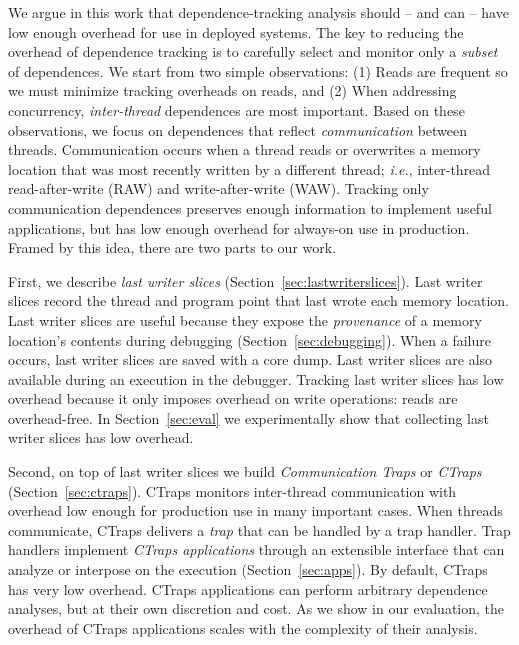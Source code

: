 \documentclass[preprint,9pt]{sigplanconf}
\newcommand{\ctraps}{CTraps\xspace}
\begin{document}
We argue in this work that dependence-tracking analysis should -- and can --
have low enough overhead for use in deployed systems.  The key to reducing the
overhead of dependence tracking is to carefully select and monitor only a
{\em subset} of dependences.  We start from two simple observations: (1) Reads are
frequent so we must minimize tracking overheads on reads, and (2) When
addressing concurrency, {\em inter-thread} dependences are most important.
Based on these observations, we focus on dependences that reflect {\em
communication} between threads.  Communication occurs when a thread reads or
overwrites a memory location that was most recently written by a different
thread; {\em i.e.}, inter-thread read-after-write (RAW) and write-after-write
(WAW).  Tracking only communication dependences preserves enough information to
implement useful applications, but has low enough overhead for always-on use in
production.  Framed by this idea, there are two parts to our work.

First, we describe {\em last writer slices}
(Section~\ref{sec:lastwriterslices}).  Last writer slices record the thread and
program point that last wrote each memory location.  Last writer slices are
useful because they expose the {\em provenance} of a memory location's contents
during debugging (Section~\ref{sec:debugging}).  When a failure occurs, last
writer slices are saved with a core dump.  Last writer slices are also
available during an execution in the debugger.  Tracking last writer slices has
low overhead because it only imposes overhead on write operations:  reads are
overhead-free.  In Section~\ref{sec:eval} we experimentally show
that collecting last writer slices has low overhead.

Second, on top of last writer slices we build {\em Communication Traps} or {\em
\ctraps}  (Section~\ref{sec:ctraps}).  \ctraps monitors inter-thread
communication with overhead low enough for production use in many important
cases.  When threads communicate, \ctraps delivers a {\em trap} that can be
handled by a trap handler.  Trap handlers implement {\em \ctraps applications}
through an extensible interface that can analyze or interpose on the execution
(Section~\ref{sec:apps}).  By default, \ctraps has very low overhead.  \ctraps
applications can perform arbitrary dependence analyses, but at their own
discretion and cost.  As we show in our evaluation, the overhead of \ctraps
applications scales with the complexity of their analysis.
\end{document}

